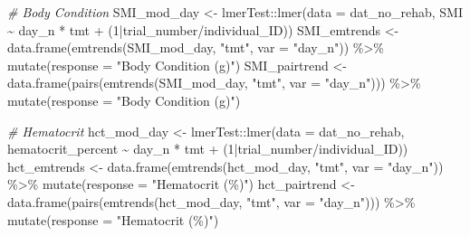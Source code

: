 \documentclass[
]{article}
\newenvironment{Shaded}{\begin{snugshade}}{\end{snugshade}}
\newcommand{\AttributeTok}[1]{\textcolor[rgb]{0.77,0.63,0.00}{#1}}
\newcommand{\CommentTok}[1]{\textcolor[rgb]{0.56,0.35,0.01}{\textit{#1}}}
\newcommand{\DecValTok}[1]{\textcolor[rgb]{0.00,0.00,0.81}{#1}}
\newcommand{\FunctionTok}[1]{\textcolor[rgb]{0.00,0.00,0.00}{#1}}
\newcommand{\NormalTok}[1]{#1}
\newcommand{\OtherTok}[1]{\textcolor[rgb]{0.56,0.35,0.01}{#1}}
\newcommand{\SpecialCharTok}[1]{\textcolor[rgb]{0.00,0.00,0.00}{#1}}
\newcommand{\StringTok}[1]{\textcolor[rgb]{0.31,0.60,0.02}{#1}}
\begin{document}
\begin{Shaded}
\begin{Highlighting}[]
\CommentTok{\# Body Condition}
\NormalTok{SMI\_mod\_day }\OtherTok{\textless{}{-}}\NormalTok{ lmerTest}\SpecialCharTok{::}\FunctionTok{lmer}\NormalTok{(}\AttributeTok{data =}\NormalTok{ dat\_no\_rehab,}
\NormalTok{                              SMI }\SpecialCharTok{\textasciitilde{}}\NormalTok{ day\_n }\SpecialCharTok{*}\NormalTok{ tmt }\SpecialCharTok{+} 
\NormalTok{                              (}\DecValTok{1}\SpecialCharTok{|}\NormalTok{trial\_number}\SpecialCharTok{/}\NormalTok{individual\_ID))}
\NormalTok{SMI\_emtrends }\OtherTok{\textless{}{-}} \FunctionTok{data.frame}\NormalTok{(}\FunctionTok{emtrends}\NormalTok{(SMI\_mod\_day, }\StringTok{"tmt"}\NormalTok{, }\AttributeTok{var =} \StringTok{"day\_n"}\NormalTok{)) }\SpecialCharTok{\%\textgreater{}\%}
  \FunctionTok{mutate}\NormalTok{(}\AttributeTok{response =} \StringTok{"Body Condition (g\textquotesingle{})"}\NormalTok{)}
\NormalTok{SMI\_pairtrend }\OtherTok{\textless{}{-}} \FunctionTok{data.frame}\NormalTok{(}\FunctionTok{pairs}\NormalTok{(}\FunctionTok{emtrends}\NormalTok{(SMI\_mod\_day, }\StringTok{"tmt"}\NormalTok{, }\AttributeTok{var =} \StringTok{"day\_n"}\NormalTok{))) }\SpecialCharTok{\%\textgreater{}\%}
  \FunctionTok{mutate}\NormalTok{(}\AttributeTok{response =} \StringTok{"Body Condition (g\textquotesingle{})"}\NormalTok{)}

\CommentTok{\# Hematocrit}
\NormalTok{hct\_mod\_day }\OtherTok{\textless{}{-}}\NormalTok{ lmerTest}\SpecialCharTok{::}\FunctionTok{lmer}\NormalTok{(}\AttributeTok{data =}\NormalTok{ dat\_no\_rehab,}
\NormalTok{                              hematocrit\_percent }\SpecialCharTok{\textasciitilde{}}\NormalTok{ day\_n }\SpecialCharTok{*}\NormalTok{ tmt }\SpecialCharTok{+} 
\NormalTok{                              (}\DecValTok{1}\SpecialCharTok{|}\NormalTok{trial\_number}\SpecialCharTok{/}\NormalTok{individual\_ID))}
\NormalTok{hct\_emtrends }\OtherTok{\textless{}{-}} \FunctionTok{data.frame}\NormalTok{(}\FunctionTok{emtrends}\NormalTok{(hct\_mod\_day, }\StringTok{"tmt"}\NormalTok{, }\AttributeTok{var =} \StringTok{"day\_n"}\NormalTok{)) }\SpecialCharTok{\%\textgreater{}\%}
  \FunctionTok{mutate}\NormalTok{(}\AttributeTok{response =} \StringTok{"Hematocrit (\%)"}\NormalTok{)}
\NormalTok{hct\_pairtrend }\OtherTok{\textless{}{-}} \FunctionTok{data.frame}\NormalTok{(}\FunctionTok{pairs}\NormalTok{(}\FunctionTok{emtrends}\NormalTok{(hct\_mod\_day, }\StringTok{"tmt"}\NormalTok{, }\AttributeTok{var =} \StringTok{"day\_n"}\NormalTok{))) }\SpecialCharTok{\%\textgreater{}\%}
  \FunctionTok{mutate}\NormalTok{(}\AttributeTok{response =} \StringTok{"Hematocrit (\%)"}\NormalTok{)}


\end{Highlighting}
\end{Shaded}
\end{document}
